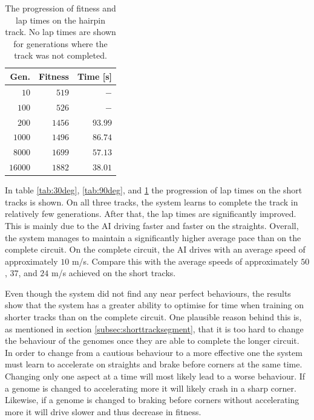 \begin{table}[H] 
  \centering
  \begin{tabular}{rrr}
            \toprule
            Gen. & Fitness & Time [s]\\
            \midrule
            $10$    & $519$     & $-$       \\
            $100$   & $526$     & $-$       \\
            $200$   & $1456$    & $93.99$   \\
            $1000$  & $1496$    & $86.74$   \\
            $8000$  & $1699$    & $57.13$   \\
            $16000$ & $1882$    & $38.01$   \\
            \bottomrule
        \end{tabular}
  \caption{The progression of fitness and lap times on the hairpin track. No lap times are shown for generations where the track was not completed.}
  \label{tab:180deg}
\end{table}

\noindent
In table \ref{tab:30deg}, \ref{tab:90deg}, and \ref{tab:180deg} the progression of lap times on the short tracks is shown. On all three tracks, the system learns to complete the track in relatively few generations. After that, the lap times are significantly improved. This is mainly due to the AI driving faster and faster on the straights. Overall, the system manages to maintain a significantly higher average pace than on the complete circuit. On the complete circuit, the AI drives with an average speed of approximately $10$ m/s. Compare this with the average speeds of approximately $50$, $37$, and $24$ m/s achieved on the short tracks. 

Even though the system did not find any near perfect behaviours, the results show that the system has a greater ability to optimise for time when training on shorter tracks than on the complete circuit. One plausible reason behind this is, as mentioned in section \ref{subsec:shorttracksegment}, that it is too hard to change the behaviour of the genomes once they are able to complete the longer circuit. In order to change from a cautious behaviour to a more effective one the system must learn to accelerate on straights and brake before corners at the same time. Changing only one aspect at a time will most likely lead to a worse behaviour. If a genome is changed to accelerating more it will likely crash in a sharp corner. Likewise, if a genome is changed to braking before corners without accelerating more it will drive slower and thus decrease in fitness.

